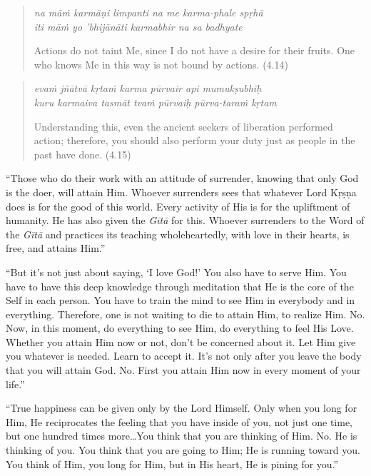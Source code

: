 \documentclass[12pt, twoside, openright]{memoir}
\begin{document}
\par
\begin{verse}
\textit{na māṁ karmāṇi limpanti na me karma-phale spṛhā} \\
\textit{iti māṁ yo ’bhijānāti karmabhir na sa badhyate}

\noindent Actions do not taint Me, since I do not have a desire for their fruits. One who knows Me in this way is not bound by actions. (4.14)
\end{verse}
\par



\par
\begin{verse}
\textit{evaṁ jñātvā kṛtaṁ karma pūrvair api mumukṣubhiḥ} \\
\textit{kuru karmaiva tasmāt tvaṁ pūrvaiḥ pūrva-taraṁ kṛtam}

\noindent Understanding this, even the ancient seekers of liberation performed action; therefore, you should also perform your duty just as people in the past have done. (4.15)
\end{verse}
\par


\enquote{Those who do their work with an attitude of surrender, knowing that only God is the doer, will attain Him. Whoever surrenders sees that whatever Lord Kṛṣṇa does is for the good of this world. Every activity of His is for the upliftment of humanity. He has also given the \textit{Gītā} for this. Whoever surrenders to the Word of the \textit{Gītā} and practices its teaching wholeheartedly, with love in their hearts, is free, and attains Him.}

\enquote{But it’s not just about saying, \enquote{I love God!} You also have to serve Him. You have to have this deep knowledge through meditation that He is the core of the Self in each person. You have to train the mind to see Him in everybody and in everything. Therefore, one is not waiting to die to attain Him, to realize Him. No. Now, in this moment, do everything to see Him, do everything to feel His Love. Whether you attain Him now or not, don’t be concerned about it. Let Him give you whatever is needed. Learn to accept it. It’s not only after you leave the body that you will attain God. No. First you attain Him now in every moment of your life.}


\enquote{True happiness can be given only by the Lord Himself. Only when you long for Him, He reciprocates the feeling that you have inside of you, not just one time, but one hundred times more\ldots You think that you are thinking of Him. No. He is thinking of you. You think that you are going to Him; He is running toward you. You think of Him, you long for Him, but in His heart, He is pining for you.}
\end{document}
